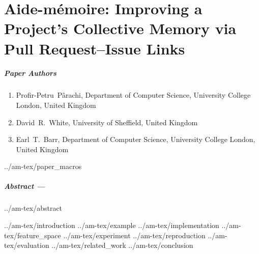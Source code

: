 \chapter{Aide-mémoire: Improving a Project’s Collective Memory via Pull Request--Issue Links}
\label{chapter:am}

\paragraph{Paper Authors}%
\begin{enumerate}
    \item[]  Profir-Petru~P\^arachi, Department of Computer Science, University College London, United Kingdom
    \item[] David~R.~White, University of Sheffield, United Kingdom
    \item[] Earl~T.~Barr, Department of Computer Science, University College London, United Kingdom
\end{enumerate}

{../am-tex/paper_macros}

\paragraph{Abstract ---}
{../am-tex/abstract}

{../am-tex/introduction}
{../am-tex/example}
{../am-tex/implementation}
{../am-tex/feature_space}
{../am-tex/experiment}
{../am-tex/reproduction}
{../am-tex/evaluation}
{../am-tex/related_work}
{../am-tex/conclusion}
